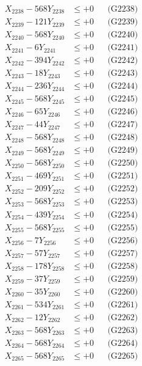 \documentclass[a4paper,10pt]{article}
\begin{document}
{\begin{align}
X_{2238} - 568Y_{2238} &\leq +0 && \text{(G2238)} \\
X_{2239} - 121Y_{2239} &\leq +0 && \text{(G2239)} \\
X_{2240} - 568Y_{2240} &\leq +0 && \text{(G2240)} \\
\allowbreak
X_{2241} - 6Y_{2241} &\leq +0 && \text{(G2241)} \\
X_{2242} - 394Y_{2242} &\leq +0 && \text{(G2242)} \\
X_{2243} - 18Y_{2243} &\leq +0 && \text{(G2243)} \\
X_{2244} - 236Y_{2244} &\leq +0 && \text{(G2244)} \\
X_{2245} - 568Y_{2245} &\leq +0 && \text{(G2245)} \\
X_{2246} - 65Y_{2246} &\leq +0 && \text{(G2246)} \\
X_{2247} - 44Y_{2247} &\leq +0 && \text{(G2247)} \\
X_{2248} - 568Y_{2248} &\leq +0 && \text{(G2248)} \\
X_{2249} - 568Y_{2249} &\leq +0 && \text{(G2249)} \\
X_{2250} - 568Y_{2250} &\leq +0 && \text{(G2250)} \\
\allowbreak
X_{2251} - 469Y_{2251} &\leq +0 && \text{(G2251)} \\
X_{2252} - 209Y_{2252} &\leq +0 && \text{(G2252)} \\
X_{2253} - 568Y_{2253} &\leq +0 && \text{(G2253)} \\
X_{2254} - 439Y_{2254} &\leq +0 && \text{(G2254)} \\
X_{2255} - 568Y_{2255} &\leq +0 && \text{(G2255)} \\
X_{2256} - 7Y_{2256} &\leq +0 && \text{(G2256)} \\
X_{2257} - 57Y_{2257} &\leq +0 && \text{(G2257)} \\
X_{2258} - 178Y_{2258} &\leq +0 && \text{(G2258)} \\
X_{2259} - 37Y_{2259} &\leq +0 && \text{(G2259)} \\
X_{2260} - 35Y_{2260} &\leq +0 && \text{(G2260)} \\
\allowbreak
X_{2261} - 534Y_{2261} &\leq +0 && \text{(G2261)} \\
X_{2262} - 12Y_{2262} &\leq +0 && \text{(G2262)} \\
X_{2263} - 568Y_{2263} &\leq +0 && \text{(G2263)} \\
X_{2264} - 568Y_{2264} &\leq +0 && \text{(G2264)} \\
X_{2265} - 568Y_{2265} &\leq +0 && \text{(G2265)} \\

\end{align}}
\end{document}
